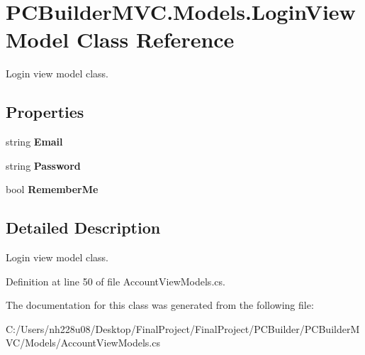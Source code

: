 \hypertarget{class_p_c_builder_m_v_c_1_1_models_1_1_login_view_model}{}\section{P\+C\+Builder\+M\+V\+C.\+Models.\+Login\+View\+Model Class Reference}
\label{class_p_c_builder_m_v_c_1_1_models_1_1_login_view_model}


Login view model class.  


\subsection*{Properties}
\begin{DoxyCompactItemize}
\item 
string {\bfseries Email}\hypertarget{class_p_c_builder_m_v_c_1_1_models_1_1_login_view_model_aad5041cce607cd8effdcd1f74ad01c76}{}\label{class_p_c_builder_m_v_c_1_1_models_1_1_login_view_model_aad5041cce607cd8effdcd1f74ad01c76}

\item 
string {\bfseries Password}\hypertarget{class_p_c_builder_m_v_c_1_1_models_1_1_login_view_model_af897b8fd8d37fb9c3c96fbdda9e2b7fa}{}\label{class_p_c_builder_m_v_c_1_1_models_1_1_login_view_model_af897b8fd8d37fb9c3c96fbdda9e2b7fa}

\item 
bool {\bfseries Remember\+Me}\hypertarget{class_p_c_builder_m_v_c_1_1_models_1_1_login_view_model_a10f675dd23224511e3c9a1b9c7d1c3e4}{}\label{class_p_c_builder_m_v_c_1_1_models_1_1_login_view_model_a10f675dd23224511e3c9a1b9c7d1c3e4}

\end{DoxyCompactItemize}


\subsection{Detailed Description}
Login view model class. 



Definition at line 50 of file Account\+View\+Models.\+cs.



The documentation for this class was generated from the following file\+:\begin{DoxyCompactItemize}
\item 
C\+:/\+Users/nh228u08/\+Desktop/\+Final\+Project/\+Final\+Project/\+P\+C\+Builder/\+P\+C\+Builder\+M\+V\+C/\+Models/Account\+View\+Models.\+cs\end{DoxyCompactItemize}
